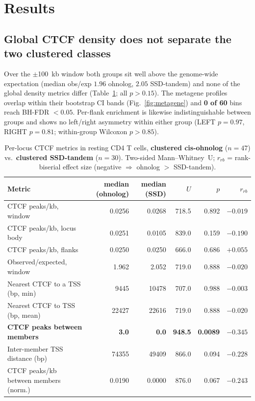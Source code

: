 \documentclass[11pt]{article}
\newcommand{\ohno}{\textcolor{ohno}{\textbf{clustered cis-ohnolog}}}
\newcommand{\ssd}{\textcolor{ssd}{\textbf{clustered SSD-tandem}}}
\begin{document}
\section{Results}

\subsection*{Global CTCF density does not separate the two clustered classes}
Over the $\pm$100~kb window both groups sit well above the genome-wide expectation (median
obs/exp $1.96$ ohnolog, $2.05$ SSD-tandem) and none of the global density metrics differ
(Table~\ref{tab:mwu}; all $p>0.15$). The metagene profiles overlap within their bootstrap CI
bands (Fig.~\ref{fig:metagene}) and \textbf{0 of 60} bins reach BH-FDR $<0.05$. Per-flank
enrichment is likewise indistinguishable between groups and shows no left/right asymmetry
within either group (LEFT $p=0.97$, RIGHT $p=0.81$; within-group Wilcoxon $p>0.85$).

\begin{table}[H]
\centering
\small
\caption{Per-locus CTCF metrics in resting CD4 T cells, \ohno{} ($n=47$) vs.\ \ssd{}
($n=30$). Two-sided Mann--Whitney~U; $r_{rb}$ = rank-biserial effect size (negative
$\Rightarrow$ ohnolog $>$ SSD-tandem).}
\label{tab:mwu}
\begin{tabular}{lrrrrr}
\toprule
Metric & median (ohnolog) & median (SSD) & $U$ & $p$ & $r_{rb}$ \\
\midrule
CTCF peaks/kb, window        & 0.0256 & 0.0268 & 718.5 & 0.892 & $-0.019$ \\
CTCF peaks/kb, locus body    & 0.0251 & 0.0105 & 839.0 & 0.159 & $-0.190$ \\
CTCF peaks/kb, flanks        & 0.0250 & 0.0250 & 666.0 & 0.686 & $+0.055$ \\
Observed/expected, window    & 1.962  & 2.052  & 719.0 & 0.888 & $-0.020$ \\
Nearest CTCF to a TSS (bp, min)  & 9445 & 10478 & 707.0 & 0.988 & $-0.003$ \\
Nearest CTCF to TSS (bp, mean)   & 22427 & 22616 & 719.0 & 0.888 & $-0.020$ \\
\textbf{CTCF peaks between members} & \textbf{3.0} & \textbf{0.0} & \textbf{948.5} & \textbf{0.0089} & $\mathbf{-0.345}$ \\
Inter-member TSS distance (bp)   & 74355 & 49409 & 866.0 & 0.094 & $-0.228$ \\
CTCF peaks/kb between members (norm.) & 0.0190 & 0.0000 & 876.0 & 0.067 & $-0.243$ \\
\bottomrule
\end{tabular}
\end{table}
\end{document}
